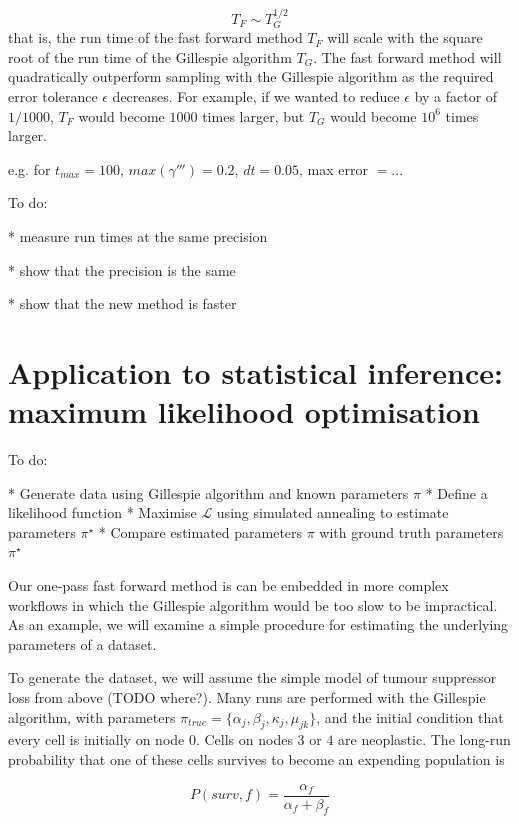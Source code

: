 \documentclass{article}
\begin{document}
\begin{equation}
    T_F \sim T_G^{1/2}
\end{equation}
that is, the run time of the fast forward method $T_F$ will scale with the
square root of the run time of the Gillespie algorithm $T_G$. The fast forward
method will quadratically outperform sampling with the Gillespie algorithm as
the required error tolerance $\epsilon$ decreases. For example, if we wanted to
reduce $\epsilon$ by a factor of $1/1000$, $T_F$ would become $1000$ times
larger, but $T_G$ would become $10^6$ times larger.

e.g. for $t_{max} = 100$, $max(\gamma''') = 0.2$, $dt = 0.05$, max error $ = ...$

To do: 

* measure run times at the same precision

* show that the precision is the same

* show that the new method is faster

\section{Application to statistical inference: maximum likelihood optimisation}

To do:

* Generate data using Gillespie algorithm and known parameters $\pi$
* Define a likelihood function
* Maximise $\mathcal{L}$ using simulated annealing to estimate parameters
  $\pi^\star$
* Compare estimated parameters $\pi$ with ground truth parameters $\pi^\star$

Our one-pass fast forward method is can be embedded in more
complex workflows in which the Gillespie algorithm would be too slow to be
impractical. As an example, we will examine a simple procedure for estimating
the underlying parameters of a dataset.

To generate the dataset, we will assume the simple model of tumour suppressor
loss from above (TODO where?). Many runs are performed with the Gillespie
algorithm, with parameters $\pi_{true} = \{\alpha_j, \beta_j, \kappa_j, \mu_{jk}\}$,
and the initial condition that every cell is initially on node $0$.
Cells on nodes $3$ or $4$ are neoplastic. The long-run probability that one of
these cells survives to become an expending population is


\begin{equation}
    P(surv,f) = \frac{\alpha_f}{\alpha_f + \beta_f}
    \label{eq:psurvival}
\end{equation}
\end{document}
